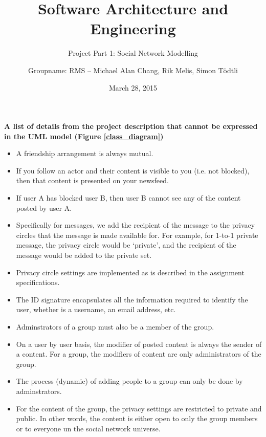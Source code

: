 \documentclass[pdftex,12pt,a4paper]{scrartcl}
\title{Software Architecture and Engineering}
\subtitle{Project Part 1: Social Network Modelling}
\date{March 28, 2015}
\author{Groupname: RMS -- Michael Alan Chang, Rik Melis, Simon T\"{o}dtli}
\begin{document}
\maketitle

{\bf A list of details from the project description that cannot be expressed in the UML model (Figure \ref{class_diagram})}
\begin{itemize}
  \item A friendship arrangement is always mutual.
  \item If you follow an actor and their content is visible to you (i.e. not blocked), then that content is presented on your newsfeed.
  \item If user A has blocked user B, then user B cannot see any of the content posted by user A.
  \item Specifically for messages, we add the recipient of the message to the privacy circles that the message is made available for.  For example, for 1-to-1 private message, the privacy circle would be `private', and the recipient of the message would be added to the private set.
  \item Privacy circle settings are implemented as is described in the assignment specifications.
  \item The ID signature encapsulates all the information required to identify the user, whether is a username, an email address, etc.
  \item Adminstrators of a group must also be a member of the group.
  \item On a user by user basis, the modifier of posted content is always the sender of a content. For a group, the modifiers of content are only administrators of the group.
  \item The process (dynamic) of adding people to a group can only be done by adminstrators.
  \item For the content of the group, the privacy settings are restricted to private and public. In other words, the content is either open to only the group members or to everyone un the social network universe.
\end{itemize}
\end{document}
